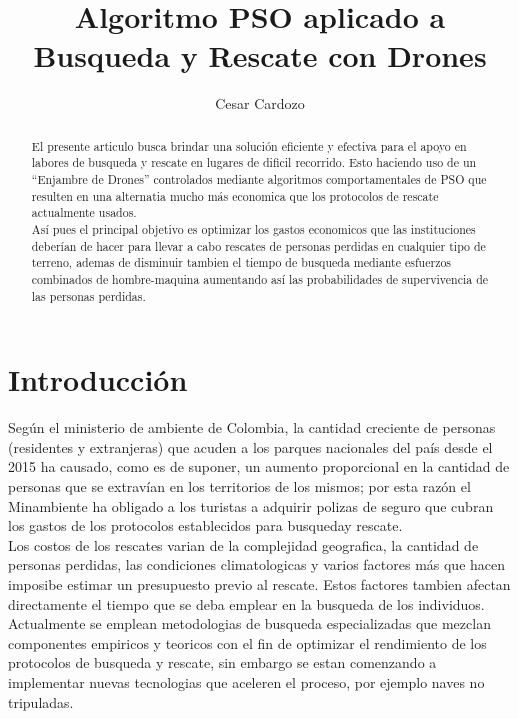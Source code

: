 \documentclass[11pt, twocolumn,letterpaper]{article}
\author{Cesar Cardozo}
\title{Algoritmo PSO aplicado a Busqueda y Rescate con Drones}
\begin{document}
\maketitle
\begin{abstract}
El presente articulo busca brindar una solución eficiente y efectiva para el apoyo en labores de busqueda y rescate en lugares de dificil recorrido. Esto haciendo uso de un ``Enjambre de Drones'' controlados mediante algoritmos comportamentales de PSO que resulten en una alternatia mucho más economica que los protocolos de rescate actualmente usados.\\

Así pues el principal objetivo es optimizar los gastos economicos que las instituciones deberían de hacer para llevar a cabo rescates de personas perdidas en cualquier tipo de terreno, ademas de disminuir tambien el tiempo de busqueda mediante esfuerzos combinados de hombre-maquina aumentando así las probabilidades de supervivencia de las personas perdidas.
\end{abstract}
\section{Introducción}
Según el ministerio de ambiente de Colombia, la cantidad creciente de personas (residentes y extranjeras) que acuden a los parques nacionales del país desde el 2015 ha causado, como es de suponer, un aumento proporcional en la cantidad de personas que se extravían en los territorios de los mismos; por esta razón el Minambiente ha obligado a los turistas a adquirir polizas de seguro que cubran los gastos de los protocolos establecidos para busqueday rescate.\\

Los costos de los rescates varian de la complejidad geografica, la cantidad de personas perdidas, las condiciones climatologicas y varios factores más que hacen imposibe estimar un presupuesto previo al rescate. Estos factores tambien afectan directamente el tiempo que se deba emplear en la busqueda de los individuos.\\

Actualmente se emplean metodologias de busqueda especializadas que mezclan componentes empiricos y teoricos con el fin de optimizar el rendimiento de los protocolos de busqueda y rescate, sin embargo se estan comenzando a implementar nuevas tecnologias que aceleren el proceso, por ejemplo naves no tripuladas.\\
\end{document}
